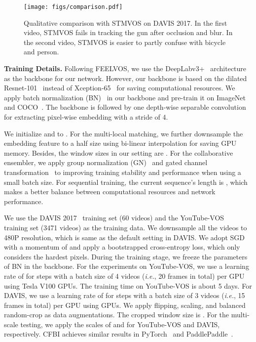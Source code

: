 \documentclass[runningheads]{llncs}
\def\ie{\emph{i.e.}}
\newcommand{\zongxin}[1]{#1}
\begin{document}
\begin{figure}[t!]
    \centering
    \texttt{[image: figs/comparison.pdf]}

    \caption{Qualitative comparison with STMVOS on DAVIS 2017. In the first video, STMVOS fails in tracking the gun after occlusion and blur. In the second video, STMVOS is easier to partly confuse with bicycle and person.}
    \label{fig:comparison}

\end{figure}

\noindent\textbf{Training Details.}
Following FEELVOS, we use the DeepLabv3+~\cite{deeplabv3p} architecture as the backbone for our network. However, our backbone is based on the dilated Resnet-101~\cite{deeplabv3p} instead of Xception-65~\cite{xception} for saving computational resources. We apply batch normalization (BN)~\cite{bn} in our backbone and pre-train it on ImageNet~\cite{deng2009imagenet} and COCO~\cite{coco}. The backbone is followed by one depth-wise separable convolution for extracting pixel-wise embedding with a stride of 4.

We initialize  and  to . For the multi-local matching, we further downsample the embedding feature to a half size using bi-linear interpolation for saving GPU memory. Besides, the window sizes in our setting are . For the collaborative ensembler, we apply group normalization (GN)~\cite{gn} and gated channel transformation~\cite{gct} to improving training stability and performance when using a small batch size. For sequential training, the current sequence's length is , which makes a better balance between computational resources and network performance.



We use the DAVIS 2017~\cite{davis2017} training set (60 videos) and the YouTube-VOS~\cite{youtubevos} training set (3471 videos) as the training data. \zongxin{We downsample all the videos to 480P resolution, which is same as the default setting in DAVIS.} We adopt SGD with a momentum of  and apply a bootstrapped cross-entropy loss, which only considers the  hardest pixels. During the training stage, we freeze the parameters of BN in the backbone. For the experiments on YouTube-VOS, we use a learning rate of  for  steps with a batch size of 4 videos (\ie, 20 frames in total) per GPU using  Tesla V100 GPUs. The training time on YouTube-VOS is about 5 days. For DAVIS, we use a learning rate of  for  steps with a batch size of 3 videos (\ie, 15 frames in total) per GPU using  GPUs.
We apply flipping, scaling, and balanced random-crop as data augmentations. The cropped window size is . For the multi-scale testing, we apply the scales of  and  for YouTube-VOS and DAVIS, respectively. CFBI achieves similar results in PyTorch~\cite{pytorch} and PaddlePaddle~\cite{paddlepaddle}.
\end{document}
